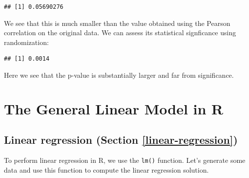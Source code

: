 \documentclass[12pt,]{book}
\newenvironment{Shaded}{\begin{snugshade}}{\end{snugshade}}
\newcommand{\CommentTok}[1]{\textcolor[rgb]{0.56,0.35,0.01}{\textit{#1}}}
\newcommand{\DataTypeTok}[1]{\textcolor[rgb]{0.13,0.29,0.53}{#1}}
\newcommand{\DecValTok}[1]{\textcolor[rgb]{0.00,0.00,0.81}{#1}}
\newcommand{\FloatTok}[1]{\textcolor[rgb]{0.00,0.00,0.81}{#1}}
\newcommand{\KeywordTok}[1]{\textcolor[rgb]{0.13,0.29,0.53}{\textbf{#1}}}
\newcommand{\NormalTok}[1]{#1}
\newcommand{\OperatorTok}[1]{\textcolor[rgb]{0.81,0.36,0.00}{\textbf{#1}}}
\newcommand{\StringTok}[1]{\textcolor[rgb]{0.31,0.60,0.02}{#1}}
\begin{document}
\begin{verbatim}
## [1] 0.05690276
\end{verbatim}

We see that this is much smaller than the value obtained using the Pearson correlation on the original data. We can assess its statistical signficance using randomization:

\begin{verbatim}
## [1] 0.0014
\end{verbatim}

Here we see that the p-value is substantially larger and far from significance.

\hypertarget{the-general-linear-model-in-r}{%
\chapter{The General Linear Model in R}\label{the-general-linear-model-in-r}}

\hypertarget{linear-regression-section-reflinear-regression}{%
\section{Linear regression (Section \ref{linear-regression})}\label{linear-regression-section-reflinear-regression}}

To perform linear regression in R, we use the \texttt{lm()} function. Let's generate some data and use this function to compute the linear regression solution.

\begin{Shaded}
\end{Shaded}
\end{document}
